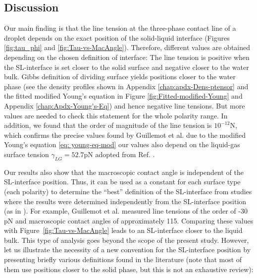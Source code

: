 \subsection{Discussion}

Our main finding is that the line tension at the three-phase contact
line of a droplet depends on the exact position of the solid-liquid
interface (Figures \ref{fig:tau_phi} and \ref{fig:Tau-vs-MacAngle}).
Therefore, different values are obtained depending on the chosen definition
of interface: The line tension is positive when the SL-interface is
set closer to the solid surface and negative closer to the water bulk.
Gibbs definition of dividing surface yields positions closer to the
water phase (see the density profiles shown in Appendix \ref{chap:apdx-Dens-ptensor}
and the fitted modified Young\textquoteright s equation in Figure
\ref{fig:Fitted-modified-Young} and Appendix \ref{chap:Apdx-Young's-Eq})
and hence negative line tensions. But more values are needed to check
this statement for the whole polarity range. In addition, we found
that the order of magnitude of the line tension is $10^{-12}\mathrm{N}$,
which confirms the precise values found by Guillemot et al. \cite{guillemot:2012}
\textendash{} due to the modified Young's equation \ref{eq: young-eq-mod}
our values also depend on the liquid-gas surface tension $\gamma_{LG}=52.7\mathrm{pN}$
adopted from Ref. \cite{sedlmeier:2008} .

Our results also show that the macroscopic contact angle is independent
of the SL-interface position. Thus, it can be used as a constant for
each surface type (each polarity) to determine the ``best'' definition
of the SL-interface from studies where the results were determined
independently from the SL-interface position (as in \cite{guillemot:2012,vazquez:2008}).
For example, Guillemot et al. \cite{guillemot:2012} measured line
tensions of the order of -30 pN and macroscopic contact angles of
approximately 115\textdegree . Comparing these values with Figure~\ref{fig:Tau-vs-MacAngle}
leads to an SL-interface closer to the liquid bulk. This type of analysis
goes beyond the scope of the present study. However, let us illustrate
the necessity of a new convention for the SL-interface position by
presenting briefly various definitions found in the literature (note
that most of them use positions closer to the solid phase, but this
is not an exhaustive review):


